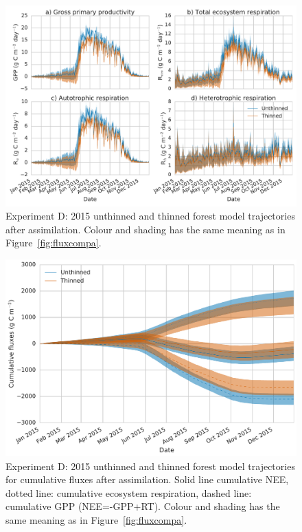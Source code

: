  
 \begin{figure}
 \noindent\includegraphics[width=40pc]{chapter/chapter7/flux_compd.pdf}
\caption{Experiment D: 2015 unthinned and thinned forest model trajectories after assimilation. Colour and shading has the same meaning as in Figure~\ref{fig:fluxcompa}.}
 \label{fig:fluxcompd}
 \end{figure}
 
  \begin{figure}
 \noindent\includegraphics[width=40pc]{chapter/chapter7/cum_fluxd.pdf}
\caption{Experiment D: 2015 unthinned and thinned forest model trajectories for cumulative fluxes after assimilation. Solid line cumulative NEE, dotted line: cumulative ecosystem respiration, dashed line: cumulative GPP (NEE=-GPP+RT). Colour and shading has the same meaning as in Figure~\ref{fig:fluxcompa}.}
 \label{fig:fluxcumd}
 \end{figure}
 
